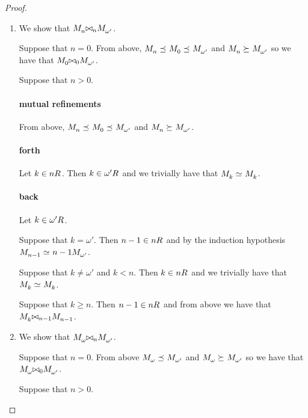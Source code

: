 \begin{proof}
\begin{enumerate}
    \item We show that $\kPModel{n} \bisimref[n] \kPModel{\omega'}$.

    Suppose that $n = 0$. 
    From above, $\kPModel{n} \refines \kPModel{0} \refines \kPModel{\omega'}$ and $\kPModel{n} \simulates \kPModel{\omega'}$ so we have that $\kPModel{0} \bisimref[0] \kPModel{\omega'}$.

    Suppose that $n > 0$.

    \paragraph{mutual refinements}

    From above, $\kPModel{n} \refines \kPModel{0} \refines \kPModel{\omega'}$ and $\kPModel{n} \simulates \kPModel{\omega'}$.

    \paragraph{forth}

    Let $k \in \kSuccessors{}{n}$. 
    Then $k \in \kSuccessors{}{\omega'}$ and we trivially have that $\kPModel{k} \bisimilar \kPModel{k}$.

    \paragraph{back}

    Let $k \in \kSuccessors{}{\omega'}$. 

    Suppose that $k = \omega'$. 
    Then $n - 1 \in \kSuccessors{}{n}$ and by the induction hypothesis $\kPModel{n - 1} \bisimilar{n - 1} \kPModel{\omega'}$.

    Suppose that $k \neq \omega'$ and $k < n$. Then $k \in \kSuccessors{}{n}$ and we trivially have that $\kPModel{k} \bisimilar \kPModel{k}$.

    Suppose that $k \geq n$. Then $n - 1 \in \kSuccessors{}{n}$ and from above we have that $\kPModel{k} \bisimref[n - 1] \kPModel{n - 1}$.
    
    \item We show that $\kPModel{\omega} \bisimref[n] \kPModel{\omega'}$.

    Suppose that $n = 0$. 
    From above $\kPModel{\omega} \refines \kPModel{\omega'}$ and  $\kPModel{\omega} \simulates \kPModel{\omega'}$ so we have that $\kPModel{\omega} \bisimref[0] \kPModel{\omega'}$.

    Suppose that $n > 0$.


\end{enumerate}
\end{proof}

